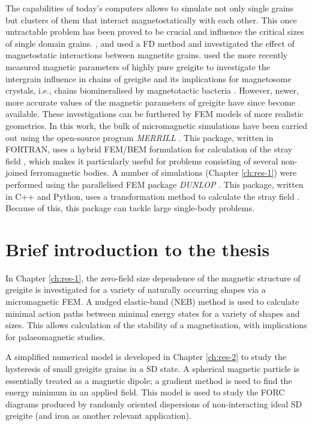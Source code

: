 The capabilities of today's computers allows to simulate not only single grains but clusters of them that interact magnetostatically with each other. This once untractable problem has been proved to be crucial and influence the critical sizes of single domain grains. \citet{Muxworthy2003}, \citet{Muxworthy2004} and \citet{Muxworthy2006} used a FD method and investigated the effect of magnetostatic interactions between magnetite grains. \citet{Muxworthy2013} used the more recently measured \citep{Chang2008} magnetic parameters of highly pure greigite to investigate the intergrain influence in chains of greigite and its implications for magnetosome crystals, i.e., chains biomineralised by magnetotactic bacteria \citep{Lefevre2011}. However, newer, more accurate values of the magnetic parameters of greigite \citep{Li2014} have since become available. These investigations can be furthered by FEM models of more realistic geometries. In this work, the bulk of micromagnetic simulations have been carried out using the open-source program \emph{MERRILL} \citep{OConbhui2017}. This package, written in FORTRAN, uses a hybrid FEM/BEM formulation for calculation of the stray field \citep{Fredkin1990}, which makes it particularly useful for problems consisting of several non-joined ferromagnetic bodies. A number of simulations (Chapter \ref{ch:res-1}) were performed using the parallelised FEM package \emph{DUNLOP} \citep{Nagy2016}. This package, written in C++ and Python, uses a transformation method to calculate the stray field \citep{Imhoff1990}. Because of this, this package can tackle large single-body problems.\par

\section{Brief introduction to the thesis}
In Chapter \ref{ch:res-1}, the zero-field size dependence of the magnetic structure of greigite is investigated for a variety of naturally occurring shapes via a micromagnetic FEM. A nudged elastic-band (NEB) method \citep{Fabian2017} is used to calculate minimal action paths between minimal energy states for a variety of shapes and sizes. This allows calculation of the stability of a magnetisation, with implications for palaeomagnetic studies.\par

A simplified numerical model is developed in Chapter \ref{ch:res-2} to study the hysteresis of small greigite grains in a SD state. A spherical magnetic particle is essentially treated as a magnetic dipole; a gradient method is used to find the energy minimum in an applied field. This model is used to study the FORC diagrams produced by randomly oriented dispersions of non-interacting ideal SD greigite (and iron as another relevant application).\par

